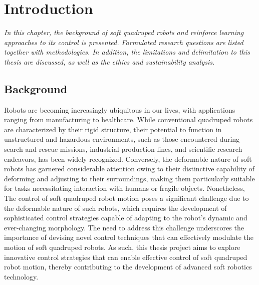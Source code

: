 \chapter{Introduction}
\label{chap1}
\textit{In this chapter, the background of soft quadruped robots and reinforce learning approaches to its control is presented. Formulated research questions are listed together with methodologies. In addition, the limitations and delimitation to this thesis are discussed, as well as the ethics and sustainability analysis.}

\section{Background}
Robots are becoming increasingly ubiquitous in our lives, with applications ranging from manufacturing to healthcare\cite{wangCurrentResearchesFuture2018}. While conventional quadruped robots are characterized by their rigid structure, their potential to function in unstructured and hazardous environments, such as those encountered during search and rescue missions\cite{hawkesSoftRobotThat2017}, industrial production lines\cite{gehringANYmalFieldSolving2021}, and scientific research endeavors\cite{hewingLearningbasedModelPredictive2020}, has been widely recognized\cite{mengReviewQuadrupedRobots2016}. Conversely, the deformable nature of soft robots has garnered considerable attention owing to their distinctive capability of deforming and adjusting to their surroundings, making them particularly suitable for tasks necessitating interaction with humans or fragile objects\cite{muralidharanSoftQuadrupedRobot2021}. Nonetheless, The control of soft quadruped robot motion poses a significant challenge due to the deformable nature of such robots, which requires the development of sophisticated control strategies capable of adapting to the robot's dynamic and ever-changing morphology\cite{wangControlStrategiesSoft2022}. The need to address this challenge underscores the importance of devising novel control techniques that can effectively modulate the motion of soft quadruped robots. As such, this thesis project aims to explore innovative control strategies that can enable effective control of soft quadruped robot motion, thereby contributing to the development of advanced soft robotics technology.


